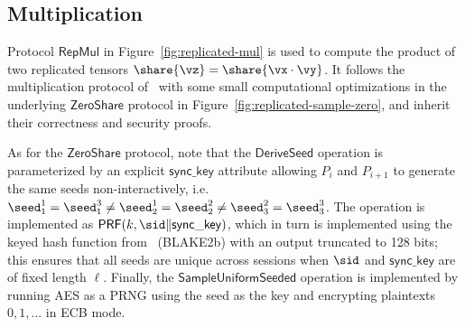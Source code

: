 \subsection{Multiplication}

Protocol $\mathsf{RepMul}$ in Figure~\ref{fig:replicated-mul} is used to compute the product of two replicated tensors $\share{\vz} = \share{\vx \cdot \vy}$. It follows the multiplication protocol of~\cite{CCS:AFLNO16} with some small computational optimizations in the underlying $\mathsf{ZeroShare}$ protocol in Figure~\ref{fig:replicated-sample-zero}, and inherit their correctness and security proofs.

As for the $\mathsf{ZeroShare}$ protocol, note that the $\mathsf{DeriveSeed}$ operation is parameterized by an explicit $\mathsf{sync\_key}$ attribute allowing $P_i$ and $P_{i+1}$ to generate the same seeds non-interactively, i.e. $\seed^1_1 = \seed^3_1 \not = \seed^1_2 = \seed^2_2 \not = \seed^2_3 = \seed^3_3$. The operation is implemented as $\mathsf{PRF}(k, \sid \| \mathsf{sync\_key})$, which in turn is implemented using the keyed hash function from~\cite{libsodium} (BLAKE2b) with an output truncated to 128 bits; this ensures that all seeds are unique across sessions when $\sid$ and $\mathsf{sync\_key}$ are of fixed length $\ell$. Finally, the $\mathsf{SampleUniformSeeded}$ operation is implemented by running AES as a PRNG using the seed as the key and encrypting plaintexts $0, 1, ...$ in ECB mode.

